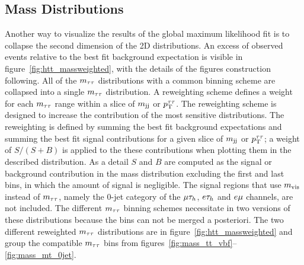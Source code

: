 \subsection{Mass Distributions}
Another way to visualize the results of the global maximum likelihood fit
is to collapse the second dimension of the 2D distributions. An excess of observed events relative 
to the best fit background expectation is visible in figure~\ref{fig:htt_massweighted},
with the details of the figures construction following.
All of the $m_{\tau\tau}$ distributions with a common binning scheme are collapsed into a single $m_{\tau\tau}$ distribution.
A reweighting scheme defines a weight for each $m_{\tau\tau}$ range within a slice of $m_\mathrm{jj}$ or $p_\mathrm{T}^{\tau\tau}$. The reweighting
scheme is designed to increase the contribution of the most sensitive distributions. The reweighting is defined
by summing the best fit background expectations and summing the best fit signal contributions for a given slice
of $m_\mathrm{jj}$ or $p_\mathrm{T}^{\tau\tau}$; a weight of $S/(S+B)$ is applied to the these contributions when plotting them in the described
distribution. As a detail $S$ and $B$ are computed as the signal or background contribution in the mass distribution 
excluding the first and last bins, in which the amount of signal is negligible. 
The signal regions that use $m_\text{vis}$ instead 
of $m_{\tau\tau}$, namely the 0-jet category of the $\mu\tau_{h}$, $e\tau_{h}$ and $e\mu$ channels, are not included. 
The different $m_{\tau\tau}$ binning schemes necessitate in two versions of these distributions because the bins
can not be merged a posteriori.
The two different reweighted $m_{\tau\tau}$ distributions are in figure~\ref{fig:htt_massweighted} and group the compatible 
$m_{\tau\tau}$ bins from figures~\ref{fig:mass_tt_vbf}--\ref{fig:mass_mt_0jet}.

